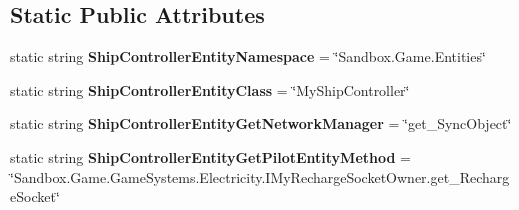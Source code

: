 \subsection*{Static Public Attributes}
\begin{DoxyCompactItemize}
\item 
\hypertarget{class_s_e_mod_a_p_i_internal_1_1_a_p_i_1_1_entity_1_1_sector_1_1_sector_object_1_1_cube_grid_1_1fd05c9636f75dd22094d44c0d12591d7_a27359d4770e58add247ced55d53dd76b}{}static string {\bfseries Ship\+Controller\+Entity\+Namespace} = \char`\"{}Sandbox.\+Game.\+Entities\char`\"{}\label{class_s_e_mod_a_p_i_internal_1_1_a_p_i_1_1_entity_1_1_sector_1_1_sector_object_1_1_cube_grid_1_1fd05c9636f75dd22094d44c0d12591d7_a27359d4770e58add247ced55d53dd76b}

\item 
\hypertarget{class_s_e_mod_a_p_i_internal_1_1_a_p_i_1_1_entity_1_1_sector_1_1_sector_object_1_1_cube_grid_1_1fd05c9636f75dd22094d44c0d12591d7_a4f2b17fd4720cb004eeb6b605b27056e}{}static string {\bfseries Ship\+Controller\+Entity\+Class} = \char`\"{}My\+Ship\+Controller\char`\"{}\label{class_s_e_mod_a_p_i_internal_1_1_a_p_i_1_1_entity_1_1_sector_1_1_sector_object_1_1_cube_grid_1_1fd05c9636f75dd22094d44c0d12591d7_a4f2b17fd4720cb004eeb6b605b27056e}

\item 
\hypertarget{class_s_e_mod_a_p_i_internal_1_1_a_p_i_1_1_entity_1_1_sector_1_1_sector_object_1_1_cube_grid_1_1fd05c9636f75dd22094d44c0d12591d7_a0652f65dbaca37c01d1967038911e411}{}static string {\bfseries Ship\+Controller\+Entity\+Get\+Network\+Manager} = \char`\"{}get\+\_\+\+Sync\+Object\char`\"{}\label{class_s_e_mod_a_p_i_internal_1_1_a_p_i_1_1_entity_1_1_sector_1_1_sector_object_1_1_cube_grid_1_1fd05c9636f75dd22094d44c0d12591d7_a0652f65dbaca37c01d1967038911e411}

\item 
\hypertarget{class_s_e_mod_a_p_i_internal_1_1_a_p_i_1_1_entity_1_1_sector_1_1_sector_object_1_1_cube_grid_1_1fd05c9636f75dd22094d44c0d12591d7_aa1818f94beddbb7ac8d461c7a8757f49}{}static string {\bfseries Ship\+Controller\+Entity\+Get\+Pilot\+Entity\+Method} = \char`\"{}Sandbox.\+Game.\+Game\+Systems.\+Electricity.\+I\+My\+Recharge\+Socket\+Owner.\+get\+\_\+\+Recharge\+Socket\char`\"{}\label{class_s_e_mod_a_p_i_internal_1_1_a_p_i_1_1_entity_1_1_sector_1_1_sector_object_1_1_cube_grid_1_1fd05c9636f75dd22094d44c0d12591d7_aa1818f94beddbb7ac8d461c7a8757f49}

\end{DoxyCompactItemize}
